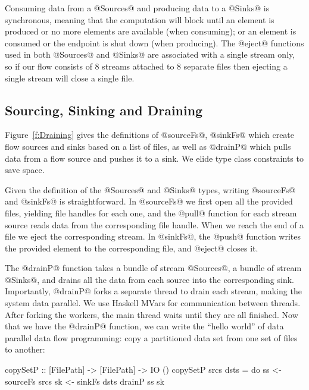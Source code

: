 Consuming data from a @Sources@ and producing data to a @Sinks@ is synchronous, meaning that the computation will block until an element is produced or no more elements are available (when consuming); or an element is consumed or the endpoint is shut down (when producing). The @eject@ functions used in both @Sources@ and @Sinks@ are associated with a single stream only, so if our flow consists of 8 streams attached to 8 separate files then ejecting a single stream will close a single file.


\subsection{Sourcing, Sinking and Draining}
Figure~\ref{f:Draining} gives the definitions of @sourceFs@, @sinkFs@ which create flow sources and sinks based on a list of files, as well as @drainP@ which pulls data from a flow source and pushes it to a sink. We elide type class constraints to save space.

Given the definition of the @Sources@ and @Sinks@ types, writing @sourceFs@ and @sinkFs@ is straightforward. In @sourceFs@ we first open all the provided files, yielding file handles for each one, and the @pull@ function for each stream source reads data from the corresponding file handle. When we reach the end of a file we eject the corresponding stream. In @sinkFs@, the @push@ function writes the provided element to the corresponding file, and @eject@ closes it.

The @drainP@ function takes a bundle of stream @Sources@, a bundle of stream @Sinks@, and drains all the data from each source into the corresponding sink. Importantly, @drainP@ forks a separate thread to drain each stream, making the system data parallel. We use Haskell MVars for communication between threads. After forking the workers, the main thread waits until they are all finished. Now that we have the @drainP@ function, we can write the ``hello world'' of data parallel data flow programming: copy a partitioned data set from one set of files to another:

\begin{code}
 copySetP :: [FilePath] -> [FilePath] -> IO ()
 copySetP srcs dsts
  = do  ss <- sourceFs srcs
        sk <- sinkFs   dsts
        drainP ss sk
\end{code}


